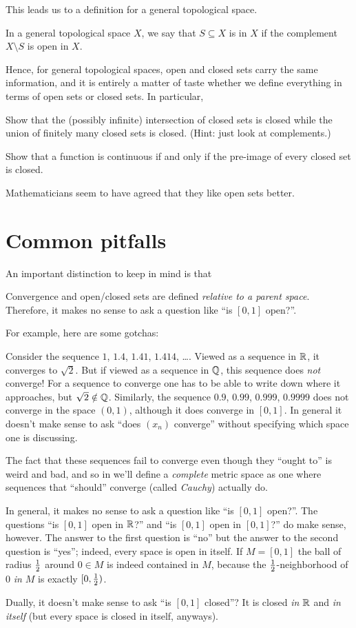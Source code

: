 This leads us to a definition for a general topological space.
\begin{definition}
	In a general topological space $X$, we say that $S \subseteq X$ is
	 in $X$ if the complement $X \setminus S$ is open in $X$.
\end{definition}
Hence, for general topological spaces, open and closed sets carry the same information,
and it is entirely a matter of taste whether we define everything in terms
of open sets or closed sets.
In particular,
\begin{ques}
	Show that the (possibly infinite) intersection of closed sets is closed
	while the union of finitely many closed sets is closed.
	(Hint: just look at complements.)
\end{ques}
\begin{ques}
	Show that a function is continuous if and only if the pre-image
	of every closed set is closed.
\end{ques}
Mathematicians seem to have agreed that they like open sets better.

\section{Common pitfalls}
An important distinction to keep in mind is that
\begin{moral}
	Convergence and open/closed sets are defined \emph{relative to a parent space}.
	Therefore, it makes no sense to ask a question like ``is $[0,1]$ open?''.
\end{moral}
For example, here are some gotchas:
\begin{itemize}
	\ii Consider the sequence $1$, $1.4$, $1.41$, $1.414$, \dots.
	Viewed as a sequence in $\mathbb R$, it converges to $\sqrt 2$.
	But if viewed as a sequence in $\mathbb Q$, this sequence does \emph{not} converge!
	For a sequence to converge one has to be able to write down where it approaches,
	but $\sqrt 2 \notin \mathbb Q$.
	Similarly, the sequence $0.9$, $0.99$, $0.999$, $0.9999$ does not converge in the space $(0,1)$,
	although it does converge in $[0,1]$.
	In general it doesn't make sense to ask
	``does $(x_n)$ converge'' without specifying which space one is discussing.

	The fact that these sequences fail to converge even though they ``ought to'' is weird and bad,
	and so in  we'll define a \emph{complete} metric space as one where sequences
	that ``should'' converge (called \emph{Cauchy}) actually do.

	\ii In general, it makes no sense to ask a question like ``is $[0,1]$ open?''.
	The questions ``is $[0,1]$ open in $\mathbb R$?'' and ``is $[0,1]$ open in $[0,1]$?'' do make sense, however.
	The answer to the first question is ``no'' but the answer to the second question is ``yes'';
	indeed, every space is open in itself.
	If $M = [0,1]$ the ball of radius $\frac{1}{2}$ around $0 \in M$ is indeed contained in $M$,
	because the $\frac{1}{2}$-neighborhood of $0$ \emph{in $M$} is exactly $[0,\frac{1}{2})$.

	\ii Dually, it doesn't make sense to ask ``is $[0,1]$ closed''?
	It is closed \emph{in $\mathbb R$} and \emph{in itself} (but every space is closed in itself, anyways).
\end{itemize}

